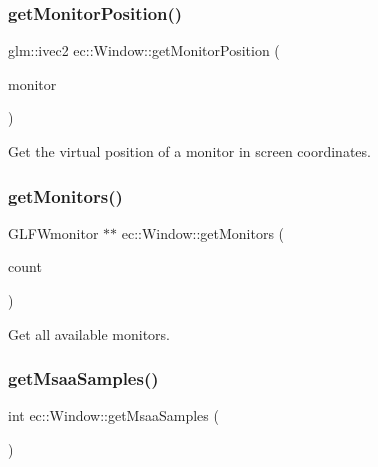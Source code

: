 \subsubsection{\texorpdfstring{get\+Monitor\+Position()}{getMonitorPosition()}}
{\footnotesize\ttfamily glm\+::ivec2 ec\+::\+Window\+::get\+Monitor\+Position (\begin{DoxyParamCaption}\item[{G\+L\+F\+Wmonitor $\ast$}]{monitor }\end{DoxyParamCaption})\hspace{0.3cm}{\ttfamily [static]}}

Get the virtual position of a monitor in screen coordinates. \mbox{\label{classec_1_1_window_a535eb59e75e88a2a9254e25f4dc878dc}} 
\subsubsection{\texorpdfstring{get\+Monitors()}{getMonitors()}}
{\footnotesize\ttfamily G\+L\+F\+Wmonitor $\ast$$\ast$ ec\+::\+Window\+::get\+Monitors (\begin{DoxyParamCaption}\item[{int $\ast$}]{count }\end{DoxyParamCaption})\hspace{0.3cm}{\ttfamily [static]}}

Get all available monitors. \mbox{\label{classec_1_1_window_abb56cab9cdf2d1969e1552be0e2540fe}} 
\subsubsection{\texorpdfstring{get\+Msaa\+Samples()}{getMsaaSamples()}}
{\footnotesize\ttfamily int ec\+::\+Window\+::get\+Msaa\+Samples (\begin{DoxyParamCaption}{ }\end{DoxyParamCaption})\hspace{0.3cm}{\ttfamily [static]}}

\mbox{\label{classec_1_1_window_aed94b4cfb1b984bc0787dd2c7d42c5e0}} 
